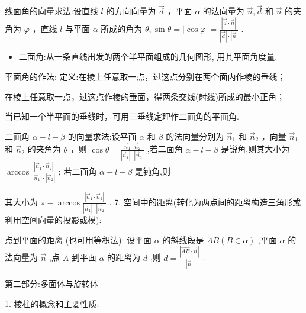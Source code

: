    线面角的向量求法:设直线 $l$ 的方向向量为 $\overrightarrow{d}$ ，平面 $\alpha$ 的法向量为 $\overrightarrow{n},\overrightarrow{d}$ 和 $\overrightarrow{n}$ 的夹角为 $\varphi$ ，直线 $l$ 与平面 $\alpha$ 所成的角为 $\theta ,\sin \theta  = \left| {\cos \varphi }\right|  = \frac{\left| \overrightarrow{d} \cdot  \overrightarrow{n}\right| }{\left| \overrightarrow{d}\right|  \cdot  \left| \overrightarrow{n}\right| }$ .

\begin{itemize}\relax
\item\relax 二面角:从一条直线出发的两个半平面组成的几何图形, 用其平面角度量.
\end{itemize}

平面角的作法:  定义:在棱上任意取一点，过这点分别在两个面内作棱的垂线；

  在棱上任意取一点，过这点作棱的垂面，得两条交线(射线)所成的最小正角；

   当已知一个半平面的垂线时，可用三垂线定理作二面角的平面角.

  二面角 $\alpha  - l - \beta$ 的向量求法:设平面 $\alpha$ 和 $\beta$ 的法向量分别为 ${\overrightarrow{n}}_{1}$ 和 ${\overrightarrow{n}}_{2}$ ，向量 ${\overrightarrow{n}}_{1}$ 和 ${\overrightarrow{n}}_{2}$ 的夹角为 $\theta$ ，则 $\cos \theta  = \frac{{\overrightarrow{n}}_{1} \cdot  {\overrightarrow{n}}_{2}}{\left| {\overrightarrow{n}}_{1}\right|  \cdot  \left| {\overrightarrow{n}}_{2}\right| }$ ,若二面角 $\alpha  - l - \beta$ 是锐角,则其大小为 $\arccos \frac{\left| {\overrightarrow{n}}_{1} \cdot  {\overrightarrow{n}}_{2}\right| }{\left| {\overrightarrow{n}}_{1}\right|  \cdot  \left| {\overrightarrow{n}}_{2}\right| }$ ; 若二面角 $\alpha  - l - \beta$ 是钝角,则

其大小为 $\pi  - \arccos \frac{\left| {\overrightarrow{n}}_{1} \cdot  {\overrightarrow{n}}_{2}\right| }{\left| {\overrightarrow{n}}_{1}\right|  \cdot  \left| {\overrightarrow{n}}_{2}\right| }$ . 7. 空间中的距离(转化为两点间的距离构造三角形或利用空间向量的投影或模):

  点到平面的距离 (也可用等积法): 设平面 $\alpha$ 的斜线段是 ${AB}\left( {B \in  \alpha }\right)$ ,平面 $\alpha$ 的法向量为 $\overrightarrow{n}$ ,点 $A$ 到平面 $\alpha$ 的距离为 $d$ ,则 $d = \frac{\left| \overrightarrow{AB} \cdot  \overrightarrow{n}\right| }{\left| \overrightarrow{n}\right| }$ .

第二部分:多面体与旋转体

1. 棱柱的概念和主要性质:

